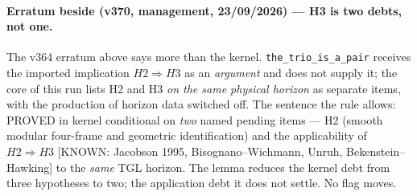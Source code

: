 \documentclass[11pt]{article}
\theoremstyle{definition}\newtheorem{deriv}{Derivation}
\begin{document}
\paragraph*{Erratum beside (v370, management, 23/09/2026) --- H3 is two debts, not one.} The v364 erratum above says more than the kernel. \texttt{the\_trio\_is\_a\_pair} receives the imported implication $H2\Rightarrow H3$ as an \emph{argument} and does not supply it; the core of this run lists H2 and H3 \emph{on the same physical horizon} as separate items, with the production of horizon data switched off. The sentence the rule allows: PROVED in kernel conditional on \emph{two} named pending items --- H2 (smooth modular four-frame and geometric identification) and the applicability of $H2\Rightarrow H3$ [KNOWN: Jacobson 1995, Bisognano--Wichmann, Unruh, Bekenstein--Hawking] to the \emph{same} TGL horizon. The lemma reduces the kernel debt from three hypotheses to two; the application debt it does not settle. No flag moves.
\end{document}
